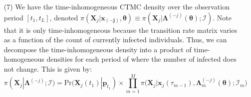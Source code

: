\documentclass[12pt]{article}
\begin{document}
\begin{enumerate}
    \item[(7)]
    We have the time-inhomogeneous CTMC density over the observation period $[t_1, t_L]$, denoted $\pi(\mathbf{X}_j | \mathbf{x_{(-j)}}, \mathbf{\theta}) \equiv \pi(\mathbf{X}_j | \mathbf{\Lambda}^{(-j)}(\mathbf{\theta}); \mathcal{I})$. Note that it is only time-inhomogeneous because the transition rate matrix varies as a function of the count of currently infected individuals. Thus, we can decompose the time-inhomogeneous density into a product of time-homogeneous densities for each period of where the number of infected does not change. This is given by: 
    \begin{equation}
    \pi (\mathbf{X}_j | \mathbf{\Lambda}^{(-j)}; \mathcal{I}) = \text{Pr}(\mathbf{X}_j(t_1) | \mathbf{p}_{t_{1}}) \times \prod_{m=1}^M \pi\big( \mathbf{X}_j | \mathbf{x}_j(\tau_{m-1}), \mathbf{\Lambda}_m^{(-j)}(\mathbf{\theta}); \mathcal{I}_m \big)
    \end{equation}
\end{enumerate}
\newpage
\end{document}
